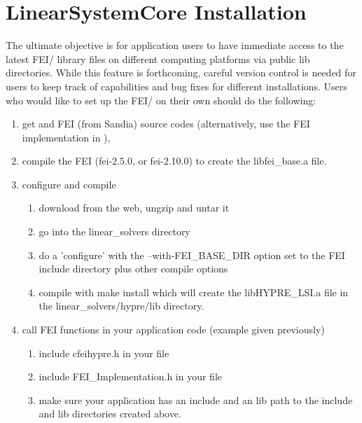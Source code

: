 \section{\hypre{} {\sf LinearSystemCore} Installation}
                                                                                
The ultimate objective is for application users to have immediate access
to the latest FEI/\hypre{} library files on different computing platforms
via public {\sf lib} directories.  While this feature is forthcoming, careful
version control is needed for users to keep track of capabilities and bug fixes
for different installations.  Users who would like to set up the FEI/\hypre{}
on their own should do the following:
                                                                                
\begin{enumerate}
                                                                                
\item get \hypre{} and FEI (from Sandia) source codes (alternatively, use
      the FEI implementation in \hypre{}),
\item compile the FEI (fei-2.5.0, or fei-2.10.0) to create the
      {\sf libfei\_base.a} file.
\item configure and compile \hypre{}
\begin{enumerate}
\item download \hypre{} from the web, ungzip and untar it
\item go into the {\sf linear\_solvers} directory
\item do a 'configure' with the {\sf --with-FEI\_BASE\_DIR} option set to
      the {\sf FEI} include directory plus other compile options
\item compile with {\sf make install} which will create the
      {\sf libHYPRE\_LSI.a} file in the {\sf linear\_solvers/hypre/lib}
      directory.
\end{enumerate}
\item call FEI functions in your application code (example given
      previously)
\begin{enumerate}
\item include {\sf cfei\-hypre.h} in your file
\item include {\sf FEI\_Implementation.h} in your file
\item make sure your application has an {\sf include} and an {\sf lib} path
      to the {\sf include} and {\sf lib} directories created above.
\end{enumerate}

\end{enumerate}
                                                                                
